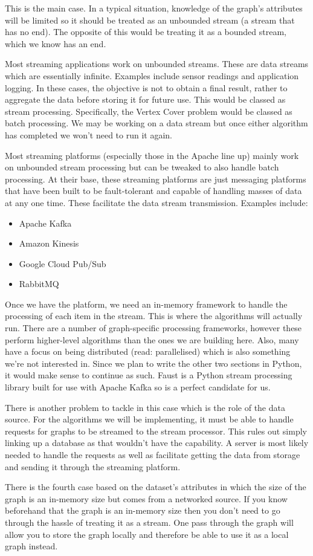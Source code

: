 This is the main case. In a typical situation, knowledge of the graph's
attributes will be limited so it should be treated as an unbounded stream (a
stream that has no end). The opposite of this would be treating it as a bounded
stream, which we know has an end.

Most streaming applications work on unbounded streams. These are data streams
which are essentially infinite. Examples include sensor readings and
application logging. In these cases, the objective is not to obtain a final
result, rather to aggregate the data before storing it for future use. This
would be classed as stream processing. Specifically, the Vertex Cover problem
would be classed as batch processing. We may be working on a data stream but
once either algorithm has completed we won't need to run it again.

Most streaming platforms (especially those in the Apache line up) mainly work
on unbounded stream processing but can be tweaked to also handle batch
processing. At their base, these streaming platforms are just messaging
platforms that have been built to be fault-tolerant and capable of handling
masses of data at any one time. These facilitate the data stream transmission.
Examples include:

\begin{itemize}
    \item
          Apache Kafka
    \item
          Amazon Kinesis
    \item
          Google Cloud Pub/Sub
    \item
          RabbitMQ
\end{itemize}

Once we have the platform, we need an in-memory framework to handle the
processing of each item in the stream. This is where the algorithms will
actually run. There are a number of graph-specific processing frameworks,
however these perform higher-level algorithms than the ones we are building
here. Also, many have a focus on being distributed (read: parallelised) which
is also something we're not interested in. Since we plan to write the other two
sections in Python, it would make sense to continue as such. Faust is a Python
stream processing library built for use with Apache Kafka so is a perfect
candidate for us.

There is another problem to tackle in this case which is the role of the data
source. For the algorithms we will be implementing, it must be able to handle
requests for graphs to be streamed to the stream processor. This rules out
simply linking up a database as that wouldn't have the capability. A server is
most likely needed to handle the requests as well as facilitate getting the
data from storage and sending it through the streaming platform.

There is the fourth case based on the dataset's attributes in which the size of
the graph is an in-memory size but comes from a networked source. If you know
beforehand that the graph is an in-memory size then you don't need to go
through the hassle of treating it as a stream. One pass through the graph will
allow you to store the graph locally and therefore be able to use it as a local
graph instead.
